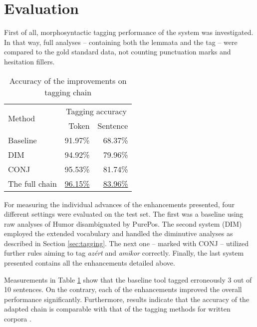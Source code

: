\section{Evaluation}

First of all, morphosyntactic tagging performance of the system was investigated. 
In that way, full analyses -- containing both the lemmata and the tag -- were compared to the gold standard data, not counting punctuation marks and hesitation fillers.

\begin{table}[H]
\centering
\caption{Accuracy of the improvements on tagging chain}
\label{tab:eval_tag}
\begin{tabular}{ l r r} 
\hline
\multicolumn{1}{l}{\multirow{2}{*}{Method}} & \multicolumn{2}{c}{\hspace{1cm}Tagging accuracy} \\
& Token &  Sentence \\
\hline
Baseline & \hspace{1cm} 91.97\%  & \hspace{1cm} 68.37\% \\
DIM &  94.92\% & 79.96\% \\
CONJ & 95.53\% & 81.74\% \\
The full chain & \underline{96.15\%} & \underline{83.96\%} \\

\hline
\end{tabular}
\end{table}

For measuring the individual advances of the enhancements presented, four different settings were evaluated on the test set. 
The first was a baseline using raw analyses of Humor disambiguated by PurePos. 
The second system (DIM) employed the extended vocabulary and handled the diminutive analyses as described in Section \ref{sec:tagging}. 
The next one -- marked with CONJ -- utilized further rules aiming to tag \textit{azért} and \textit{amikor} correctly. 
Finally, the last system presented contains all the enhancements detailed above.

Measurements in Table \ref{tab:eval_tag} show that the baseline tool tagged erroneously 3 out of 10 sentences. 
On the contrary, each of the enhancements improved the overall performance significantly.
Furthermore, results indicate that the accuracy of the adapted chain is comparable with that of the tagging methods for written corpora \cite{zsibrata2013magyarlanc}. 

